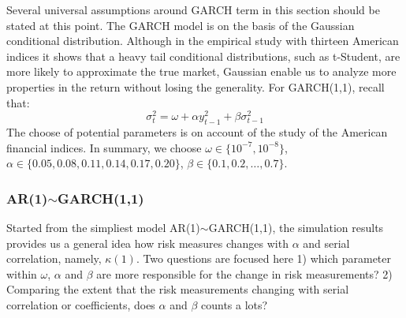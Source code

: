 \documentclass[11pt]{article}
\begin{document}
Several universal assumptions around GARCH term in this section should be stated at this point. The GARCH model is on the basis of the Gaussian conditional distribution. Although in the empirical study with thirteen American indices it shows that a heavy tail conditional distributions, such as t-Student, are more likely to approximate the true market, Gaussian enable us to analyze more properties in the return without losing the generality. For GARCH(1,1), recall  that:
\[
\sigma^2_t = \omega + \alpha y_{t-1}^2 + \beta \sigma^2_{t-1}
\]The choose of potential parameters is on account of the study of the American financial indices. In summary, we choose $\omega \in \{10^{-7}, 10^{-8}\}$, $\alpha \in \{0.05, 0.08, 0.11, 0.14, 0.17, 0.20\}$, $\beta  \in \{0.1,0.2,\dots, 0.7\}$.

\subsubsection{AR(1)$\sim$GARCH(1,1)}
Started from the simpliest model AR(1)$\sim$GARCH(1,1), the simulation results provides us a general idea how risk measures changes with $\alpha$ and serial correlation, namely, $\kappa(1)$. Two questions are focused here 1) which parameter within $\omega$, $\alpha$ and $\beta$ are more responsible for the change in risk measurements? 2) Comparing the extent that the risk measurements changing with serial correlation or coefficients, does $\alpha$ and $\beta$ counts a lots?
\end{document}
